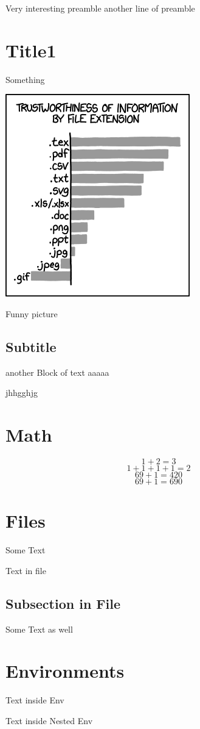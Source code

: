 Very interesting preamble
another line of preamble

\section{Title1}
Something

\includegraphics{image.png}
\caption{Funny picture}
\subsection{Subtitle}
another Block of text
aaaaa

jhhgghjg

\section{Math}
\label{math}
$$1+2 = 3$$
\[1+1+1+1=2\]
\begin{displaymath}
69 + 1 = 420
\end{displaymath}
\begin{equation}
69 + 1 = 690
\end{equation}
\section{Files}
Some Text

Text in file

\subsection{Subsection in File}
Some Text as well

\section{Environments}
\begin{Some_Env}
Text inside Env

\begin{Nested_Env}
Text inside Nested Env

\end{Nested_Env}
\end{Some_Env}

